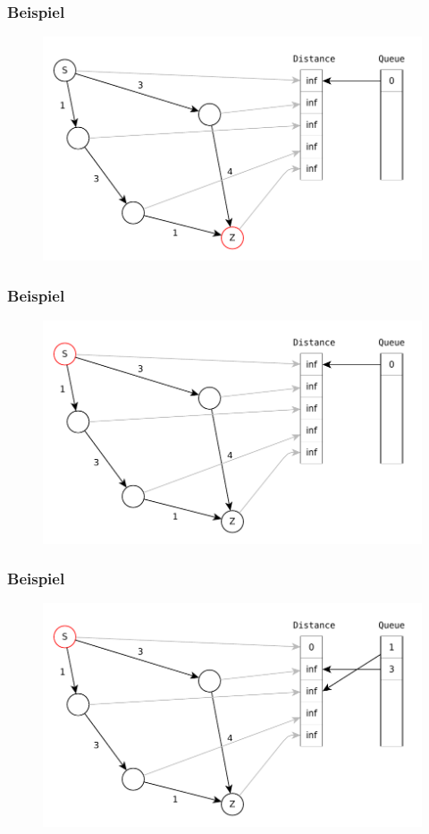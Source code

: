 \begin{frame}
\frametitle{Beispiel}
\begin{figure}
\includegraphics[scale=.8]{dijkstra_graphs/dijkstra_0.pdf}
\end{figure}
\end{frame}

\begin{frame}
\frametitle{Beispiel}
\begin{figure}
\includegraphics[scale=.8]{dijkstra_graphs/dijkstra_1.pdf}
\end{figure}
\end{frame}

\begin{frame}
\frametitle{Beispiel}
\begin{figure}
\includegraphics[scale=.8]{dijkstra_graphs/dijkstra_2.pdf}
\end{figure}
\end{frame}

